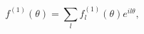 \begin{equation*}
f^{\left( 1\right) }(\theta )=\sum_{l}^{{}}f_{l}^{\left( 1\right) }(\theta
)e^{il\theta },
\end{equation*}

